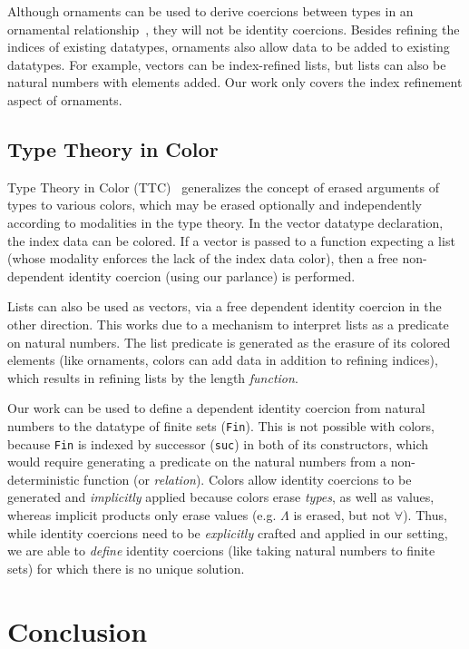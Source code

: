 \documentclass[a4paper,envcountsame,envcountsect]{llncs}
\newcommand{\labsec}[1]{\label{sec:#1}}
\begin{document}
Although ornaments can be used to derive coercions between
types in an ornamental
relationship~\cite{ornaments:original,ornaments:relational},
they will not be identity coercions.
Besides refining the indices of existing datatypes, ornaments
also allow data to be added to existing datatypes. For example, vectors can
be index-refined lists, but lists can also be natural numbers with
elements added. Our work only covers the index refinement aspect of
ornaments.

\subsection{Type Theory in Color}

Type Theory in Color (TTC)~\cite{bernardy:color}
generalizes the concept of erased arguments
of types to various colors, which may be erased optionally and
independently according to modalities in the type theory. In the vector
datatype declaration, the index data can be colored. If a vector is
passed to a function expecting a list (whose modality enforces the
lack of the index data color), then a free non-dependent identity
coercion (using our parlance) is performed.

Lists can also be used as vectors, via a free dependent identity
coercion in the other direction. This works due to a mechanism to
interpret lists as a predicate on natural numbers. The list predicate is
generated as the erasure of its colored elements (like ornaments,
colors can add data in addition to refining indices), which results in
refining lists by the length \textit{function}.

Our work can be used to define a dependent identity coercion
from natural numbers to the datatype of
finite sets (\texttt{Fin}). This is not possible with colors, because
\texttt{Fin} is indexed by successor (\texttt{suc}) in both of its
constructors, which would require generating a predicate on the
natural numbers from a non-deterministic function (or
\textit{relation}). Colors allow identity coercions to be
generated and \textit{implicitly} applied because colors erase \textit{types}, as
well as values, whereas implicit products only erase values
(e.g. $\Lambda$ is erased, but not $\forall$).
Thus, while identity coercions
need to be \textit{explicitly} crafted and applied in our setting, we
are able to \textit{define} identity coercions (like taking natural numbers to
finite sets) for which there is no unique solution.

\section{Conclusion}
\labsec{conc}
\end{document}
